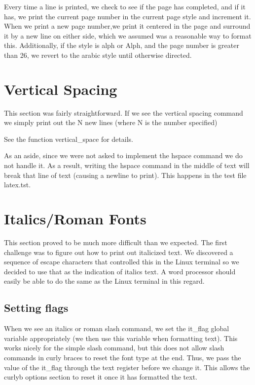 Every time a line is printed, we check to see if the page has completed, and if it has, we print the current page number in the current page style and increment it. When we print a new page number,we print it centered in the page and surround it by a new line on either side, which we assumed was a reasonable way to format this. Additionally, if the style is alph or Alph, and the page number is greater than 26, we revert to the arabic style until otherwise directed.


\section{Vertical Spacing}

This section was fairly straightforward. If we see the vertical spacing command we
simply print out the N new lines (where N is the number specified) 

See the function vertical_space for details.

As an aside, since we were not asked to implement the hspace command we do not handle
it. As a result, writing the hspace command in the middle of text will break that line
of text (causing a newline to print). This happens in the test file latex.tst.

\section{Italics/Roman Fonts}

This section proved to be much more difficult than we expected. The first challenge
was to figure out how to print out italicized text. We discovered a sequence of
escape characters that controlled this in the Linux terminal so we decided to use that
as the indication of italics text. A word processor should easily be able to do the same
as the Linux terminal in this regard.

\subsection{Setting flags}
When we see an italics or roman slash command, we set the it_flag global variable 
appropriately (we then use this variable when formatting text). This works nicely
for the simple slash command, but this does not allow slash commands in curly braces
to reset the font type at the end. Thus, we pass the value of the it_flag through the text register before
we change it. This allows the curlyb options section to reset it once it has formatted the
text.

